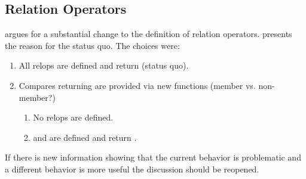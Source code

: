 \subsection{Relation Operators} \ghfeedback
\textcite{P0820R1} argues for a substantial change to the definition of relation operators.
\textcite{P0851R0} presents the reason for the status quo.
The choices were:
\begin{enumerate}
  \item All relops are defined and return \mask (status quo).
  \item Compares returning \mask are provided via new functions (member vs. non-member?)
    \begin{enumerate}
      \item No relops are defined.
      \item {} and  are defined and return \bool.
    \end{enumerate}
\end{enumerate}
If there is new information showing that the current behavior is problematic and a different behavior is more useful the discussion should be reopened.


